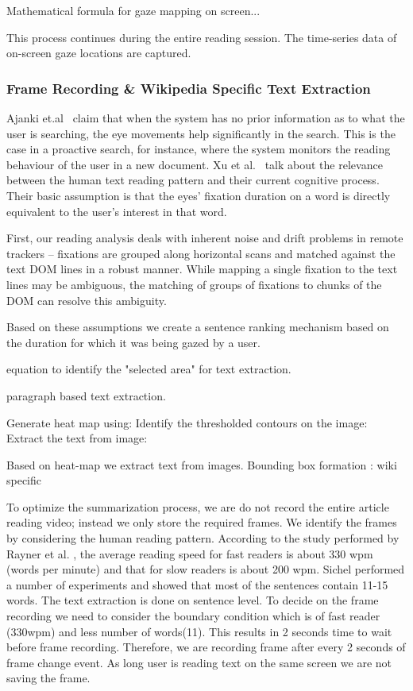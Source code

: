 \documentclass[12pt]{article}
\begin{document}
Mathematical formula for gaze mapping on screen...

This process continues during the entire reading session. The time-series data of on-screen gaze locations are captured. 



\subsubsection{Frame Recording \& Wikipedia Specific Text Extraction}

Ajanki et.al~\cite{bff9c00ddce3404ca729f4a96d53a701} claim that when the system has no prior information as to what the user is searching, the eye movements help significantly in the search. This is the case in a proactive search, for instance, where the system monitors the reading behaviour of the user in a new document. Xu et al.~\cite{xu2009user} talk about the relevance between the human text reading pattern and their current cognitive process. Their basic assumption is that the eyes' fixation duration on a word is directly equivalent to the user's interest in that word. 


First, our reading analysis deals
with inherent noise and drift problems in remote trackers –
fixations are grouped along horizontal scans and matched
against the text DOM lines in a robust manner. While
mapping a single fixation to the text lines may be
ambiguous, the matching of groups of fixations to chunks
of the DOM can resolve this ambiguity. 

Based on these assumptions we create a sentence ranking mechanism based on the duration for which it was being gazed by a user.

equation to identify the "selected area" for text extraction.

\cite{c7691a9428684758a206610e6bd9ee3e} paragraph based text extraction.

Generate heat map using:
Identify the thresholded contours on the image:
Extract the text from image:

Based on heat-map we extract text from images. Bounding box formation : wiki specific


To optimize the summarization process, we are do not record the entire article reading video; instead we only store the required frames. We identify the frames by considering the human reading pattern. According to the study performed by Rayner et al. \cite{rayner2010eye}, the average reading speed for fast readers is about 330 wpm (words per minute) and that for slow readers is about 200 wpm. Sichel \cite{sichel1974distribution} performed a number of experiments and showed that most of the sentences contain 11-15 words. The text extraction is done on sentence level. To decide on the frame recording we need to consider the boundary condition which is of fast reader (330wpm) and less number of words(11). This results in 2 seconds time to wait before frame recording. Therefore, we are recording frame after every 2 seconds of frame change event. As long user is reading text on the same screen we are not saving the frame.
\end{document}
